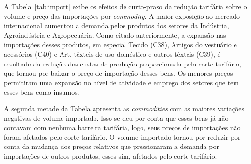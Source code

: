 

A Tabela~\ref{tab:import} exibe os efeitos de curto-prazo da redução tarifária sobre o volume e preço das importações por \textit{commodity}. A maior exposição ao mercado internacional aumentou a demanda pelos produtos dos setores da Indústria, Agroindústria e Agropecuária. Como citado anteriormente, a expansão nas importações desses produtos, em especial Tecido (C38), Artigos do vestuário e acessórios (C40) e Art. têxteis de uso doméstico e outros têxteis (C39), é resultado da redução dos custos de produção proporcionada pelo corte tarifário, que tornou por baixar o preço de importação desses bens. Os menores preços permitiram uma expansão no nível de atividade e emprego dos setores que tem esses bens como insumos.

A segunda metade da Tabela apresenta as \textit{commodities} com as maiores variações negativas de volume importado. Isso se deu por conta que esses bens já não contavam com nenhuma barreira tarifária, logo, seus preços de importações não foram afetados pelo corte tarifário. O volume importado tornou por reduzir por conta da mudança dos preços relativos que pressionaram a demanda por importações de outros produtos, esses sim, afetados pelo corte tarifário.



